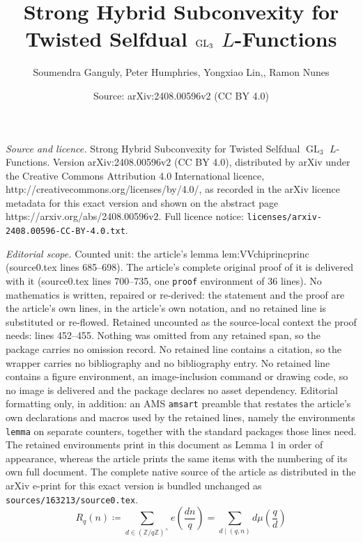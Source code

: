\documentclass[10pt,a4paper]{amsart}
\title{Strong Hybrid Subconvexity for Twisted Selfdual $\GL_3$ $L$-Functions}
\author{Soumendra Ganguly, Peter Humphries, Yongxiao Lin,, Ramon Nunes}
\date{Source: arXiv:2408.00596v2 (CC BY 4.0)}
\DeclareMathOperator{\GL}{GL}
\newcommand{\Z}{\mathbb{Z}}
\begin{document}
\maketitle

\noindent\emph{Source and licence.} Strong Hybrid Subconvexity for Twisted Selfdual $\GL_3$ $L$-Functions. Version arXiv:2408.00596v2 (CC BY 4.0), distributed by arXiv under the Creative Commons Attribution 4.0 International licence, http://creativecommons.org/licenses/by/4.0/, as recorded in the arXiv licence metadata for this exact version and shown on the abstract page https://arxiv.org/abs/2408.00596v2. Full licence notice: \texttt{licenses/arxiv-2408.00596-CC-BY-4.0.txt}.\par\smallskip

\noindent\textit{Editorial scope.} Counted unit: the article's lemma lem:VVchiprincprinc (source0.tex lines 685--698). The article's complete original proof of it is delivered with it (source0.tex lines 700--735, one \texttt{proof} environment of 36 lines). No mathematics is written, repaired or re-derived: the statement and the proof are the article's own lines, in the article's own notation, and no retained line is substituted or re-flowed.  Retained uncounted as the source-local context the proof needs: lines 452--455.  Nothing was omitted from any retained span, so the package carries no omission record.  No retained line contains a citation, so the wrapper carries no bibliography and no bibliography entry.  No retained line contains a figure environment, an image-inclusion command or drawing code, so no image is delivered and the package declares no asset dependency.  Editorial formatting only, in addition: an AMS \texttt{amsart} preamble that restates the article's own declarations and macros used by the retained lines, namely the environments \texttt{lemma} on separate counters, together with the standard packages those lines need.  The retained environments print in this document as Lemma 1 in order of appearance, whereas the article prints the same items with the numbering of its own full document.  The complete native source of the article as distributed in the arXiv e-print for this exact version is bundled unchanged as \texttt{sources/163213/source0.tex}.
\begin{equation}
\label{eqn:Rqndefeq}
R_q(n) \coloneqq \sum_{d \in (\Z/q\Z)^{\times}} e\left(\frac{dn}{q}\right) = \sum_{d \mid (q,n)} d \mu\left(\frac{q}{d}\right)
\end{equation}
\end{document}
